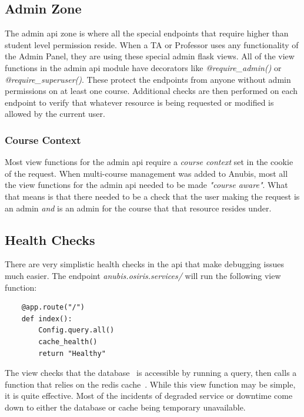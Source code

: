 \subsection{Admin Zone}\label{subsec:api-admin-zone}
The admin api zone is where all the special endpoints that require higher than student level permission reside.
When a TA or Professor uses any functionality of the Admin Panel, they are using these special
admin flask views.
All of the view functions in the admin api module have decorators like \textit{@require\_admin()} or
\textit{@require\_superuser()}.
These protect the endpoints from anyone without admin permissions on at least one course.
Additional checks are then performed on each endpoint to verify that whatever resource is being requested
or modified is allowed by the current user.

\subsubsection{Course Context}\label{subsubsec:course-context}
Most view functions for the admin api require a \textit{course context} set in the cookie of the request.
When multi-course management was added to Anubis, most all the view functions for the admin api
needed to be made \textit{"course aware"}.
What that means is that there needed to be a check that the user making the request is an admin \textit{and} is
an admin for the course that that resource resides under.

\subsection{Health Checks}\label{subsec:api-health-checks}
There are very simplistic health checks in the api that make debugging issues much easier.
The endpoint \textit{anubis.osiris.services/} will run the following view function:

\begin{verbatim}
    @app.route("/")
    def index():
        Config.query.all()
        cache_health()
        return "Healthy"
\end{verbatim}

The view checks that the database~ is accessible by running a query, then calls a function that relies on the
redis cache~.
While this view function may be simple, it is quite effective.
Most of the incidents of degraded service or downtime come down to either the database or cache being temporary
unavailable.


